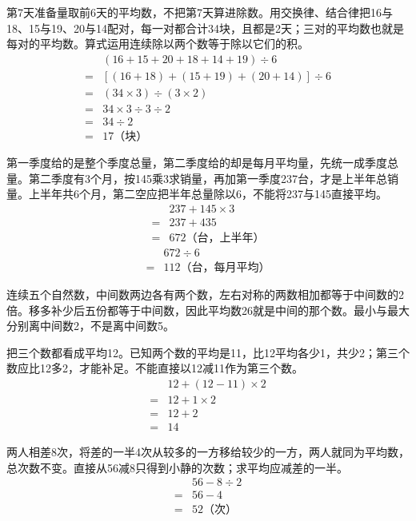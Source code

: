 \documentclass[multi=snippet,border=0pt]{standalone}
\newenvironment{snippet}[3]{\begin{minipage}{#1bp}\color{answerred}\fontsize{#2}{#3}\selectfont\raggedright}{\end{minipage}}
\begin{document}
\begin{snippet}{505}{11.5}{14}第7天准备量取前6天的平均数，不把第7天算进除数。用交换律、结合律把16与18、15与19、20与14配对，每一对都合计34块，且都是2天；三对的平均数也就是每对的平均数。算式运用连续除以两个数等于除以它们的积。\[\begin{aligned}&(16+15+20+18+14+19)\div6\\={}&[(16+18)+(15+19)+(20+14)]\div6\\={}&(34\times3)\div(3\times2)\\={}&34\times3\div3\div2\\={}&34\div2\\={}&17\text{（块）}\end{aligned}\]\end{snippet}
\begin{snippet}{505}{11.5}{14}第一季度给的是整个季度总量，第二季度给的却是每月平均量，先统一成季度总量。第二季度有3个月，按145乘3求销量，再加第一季度237台，才是上半年总销量。上半年共6个月，第二空应把半年总量除以6，不能将237与145直接平均。\[\begin{aligned}&237+145\times3\\={}&237+435\\={}&672\text{（台，上半年）}\end{aligned}\]\[\begin{aligned}&672\div6\\={}&112\text{（台，每月平均）}\end{aligned}\]\end{snippet}
\begin{snippet}{505}{11.5}{14}连续五个自然数，中间数两边各有两个数，左右对称的两数相加都等于中间数的2倍。移多补少后五份都等于中间数，因此平均数26就是中间的那个数。最小与最大分别离中间数2，不是离中间数5。\end{snippet}
\begin{snippet}{505}{11.5}{14}把三个数都看成平均12。已知两个数的平均是11，比12平均各少1，共少2；第三个数应比12多2，才能补足。不能直接以12减11作为第三个数。\[\begin{aligned}&12+(12-11)\times2\\={}&12+1\times2\\={}&12+2\\={}&14\end{aligned}\]\end{snippet}
\begin{snippet}{505}{11.5}{14}两人相差8次，将差的一半4次从较多的一方移给较少的一方，两人就同为平均数，总次数不变。直接从56减8只得到小静的次数；求平均应减差的一半。\[\begin{aligned}&56-8\div2\\={}&56-4\\={}&52\text{（次）}\end{aligned}\]\end{snippet}
\end{document}

